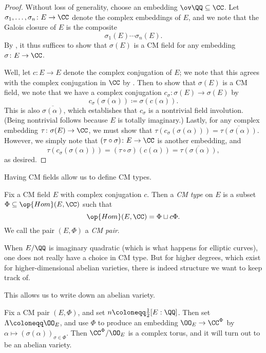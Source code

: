 \documentclass[../notes.tex]{subfiles}
\begin{document}
\begin{proof}
	Without loss of generality, choose an embedding $\ov\QQ\subseteq\CC$. Let $\sigma_1,\ldots,\sigma_n\colon E\to\CC$ denote the complex embeddings of $E$, and we note that the Galois closure of $E$ is the composite
	\[\sigma_1(E)\cdots\sigma_n(E).\]
	By , it thus suffices to show that $\sigma(E)$ is a CM field for any embedding $\sigma\colon E\to\CC$.
	
	Well, let $c\colon E\to E$ denote the complex conjugation of $E$; we note that this agrees with the complex conjugation in $\CC$ by .
	Then to show that $\sigma(E)$ is a CM field, we note that we have a complex conjugation $c_\sigma\colon\sigma(E)\to\sigma(E)$ by
	\[c_\sigma(\sigma(\alpha))\coloneqq\sigma(c(\alpha)).\]
	This is also $\overline{\sigma(\alpha)}$, which establishes that $c_\sigma$ is a nontrivial field involution. (Being nontrivial follows because $E$ is totally imaginary.) Lastly, for any complex embedding $\tau\colon\sigma(E)\to\CC$, we must show that $\tau(c_\sigma(\sigma(\alpha)))=\overline{\tau(\sigma(\alpha))}$. However, we simply note that $(\tau\circ\sigma)\colon E\to\CC$ is another embedding, and
	\[\tau(c_\sigma(\sigma(\alpha)))=(\tau\circ\sigma)(c(\alpha))=\overline{\tau(\sigma(\alpha))},\]
	as desired.
\end{proof}
Having CM fields allow us to define CM types.
\begin{definition}[CM type]
	Fix a CM field $E$ with complex conjugation $c$. Then a \textit{CM type} on $E$ is a subset $\Phi\subseteq\op{Hom}(E,\CC)$ such that
	\[\op{Hom}(E,\CC)=\Phi\sqcup c\Phi.\]
	We call the pair $(E,\Phi)$ a \textit{CM pair}.
\end{definition}
\begin{remark}
	When $E/\QQ$ is imaginary quadratic (which is what happens for elliptic curves), one does not really have a choice in CM type. But for higher degrees, which exist for higher-dimensional abelian varieties, there is indeed structure we want to keep track of.
\end{remark}
This allows us to write down an abelian variety.
\begin{exe}
	Fix a CM pair $(E,\Phi)$, and set $n\coloneqq\frac12[E:\QQ]$. Then set $\Lambda\coloneqq\OO_E$, and use $\Phi$ to produce an embedding $\OO_E\to\CC^\Phi$ by $\alpha\mapsto(\sigma(\alpha))_{\sigma\in\Phi}$. Then $\CC^\Phi/\OO_E$ is a complex torus, and it will turn out to be an abelian variety.
\end{exe}
\end{document}
